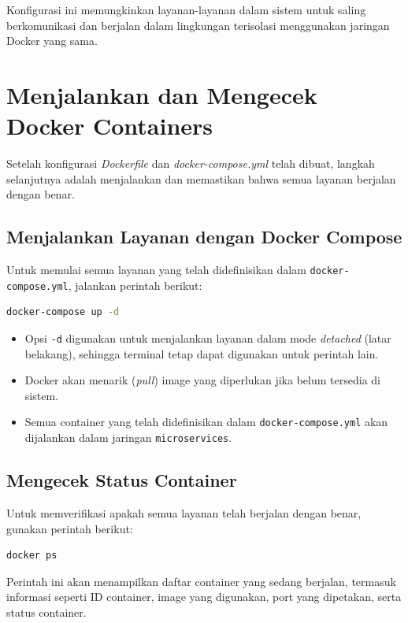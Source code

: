 Konfigurasi ini memungkinkan layanan-layanan dalam sistem untuk saling berkomunikasi dan berjalan dalam lingkungan terisolasi menggunakan jaringan Docker yang sama.


\section{Menjalankan dan Mengecek Docker Containers}

Setelah konfigurasi \textit{Dockerfile} dan \textit{docker-compose.yml} telah dibuat, langkah selanjutnya adalah menjalankan dan memastikan bahwa semua layanan berjalan dengan benar.

\subsection{Menjalankan Layanan dengan Docker Compose}

Untuk memulai semua layanan yang telah didefinisikan dalam \texttt{docker-compose.yml}, jalankan perintah berikut:

\begin{lstlisting}[language=bash]
	docker-compose up -d
\end{lstlisting}

\begin{itemize}
	\item Opsi \texttt{-d} digunakan untuk menjalankan layanan dalam mode \textit{detached} (latar belakang), sehingga terminal tetap dapat digunakan untuk perintah lain.
	\item Docker akan menarik (\textit{pull}) image yang diperlukan jika belum tersedia di sistem.
	\item Semua container yang telah didefinisikan dalam \texttt{docker-compose.yml} akan dijalankan dalam jaringan \texttt{microservices}.
\end{itemize}

\subsection{Mengecek Status Container}

Untuk memverifikasi apakah semua layanan telah berjalan dengan benar, gunakan perintah berikut:

\begin{lstlisting}[language=bash]
	docker ps
\end{lstlisting}

Perintah ini akan menampilkan daftar container yang sedang berjalan, termasuk informasi seperti ID container, image yang digunakan, port yang dipetakan, serta status container.


